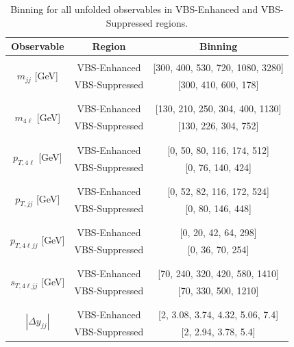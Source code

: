 \begin{table}
    \caption{Binning for all unfolded observables in VBS-Enhanced and VBS-Suppressed regions. \label{tab:binning}}
    \begin{center}
    \begin{tabular}{ | c | c | c | }
    \hline
    Observable & Region & Binning \\
    \hline \hline
    \multirow{4}{*}{ $m_{jj}$ [GeV] } &  &  \\
        & VBS-Enhanced & [300, 400, 530, 720, 1080, 3280] \\
    & VBS-Suppressed & [300, 410, 600, 178] \\
    & &\\
    \hline
    \multirow{4}{*}{ $m_{4\ell}$ [GeV] } &  &  \\
        & VBS-Enhanced & [130, 210, 250, 304, 400, 1130] \\
    & VBS-Suppressed & [130, 226, 304, 752] \\
    & &\\
    \hline
    \multirow{4}{*}{ $p_{T,4\ell}$ [GeV] } &  &  \\
    & VBS-Enhanced & [0, 50, 80, 116, 174, 512] \\
    & VBS-Suppressed & [0, 76, 140, 424]\\
    & &\\
    \hline
    \multirow{4}{*}{ $p_{T,jj}$ [GeV] } &  &  \\
    & VBS-Enhanced & [0, 52, 82, 116, 172, 524] \\
    & VBS-Suppressed & [0, 80, 146, 448]\\
    & &\\
    \hline
    \multirow{4}{*}{ $p_{T,4\ell jj}$ [GeV] } &  &  \\
    & VBS-Enhanced & [0, 20, 42, 64, 298] \\
    & VBS-Suppressed & [0, 36, 70, 254]\\
    & &\\
    \hline
    \multirow{4}{*}{ $s_{T,4\ell jj}$ [GeV] } &  &  \\
    & VBS-Enhanced & [70, 240, 320, 420, 580, 1410] \\
    & VBS-Suppressed & [70, 330, 500, 1210]\\
    & &\\
    \hline
    \multirow{4}{*}{ $|\Delta y_{jj}|$ } &  &  \\
    & VBS-Enhanced & [2, 3.08, 3.74, 4.32, 5.06, 7.4] \\
    & VBS-Suppressed & [2, 2.94, 3.78, 5.4]\\

\end{tabular}
\end{center}
\end{table}
